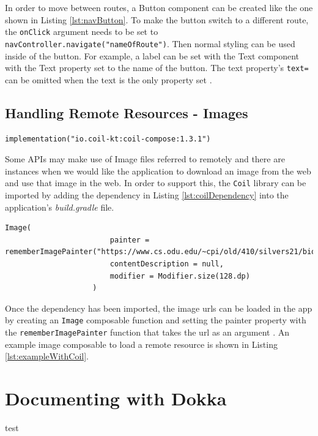 \documentclass[12pt]{article}
\begin{document}
In order to move between routes, a Button component can be created like the one shown in Listing \ref{lst:navButton}. To make the button switch to a different route, the \verb|onClick| argument needs to be set to \verb|navController.navigate("nameOfRoute")|. Then normal styling can be used inside of the button. For example, a label can be set with the Text component with the Text property set to the name of the button. The text property's \verb|text=| can be omitted when the text is the only property set \cite{mediumJetpackNavigation}.  

\subsection{Handling Remote Resources - Images}
\begin{lstlisting}[numbers=none, 
			caption=Coil Dependency,
			label={lst:coilDependency}]
implementation("io.coil-kt:coil-compose:1.3.1")
\end{lstlisting}
Some APIs may make use of Image files referred to remotely and there are instances when we would like the application to download an image from the web and use that image in the web. In order to support this, the \verb|Coil| library can be imported by adding the dependency in Listing \ref{lst:coilDependency} into the application's \textit{build.gradle} file. 

\begin{lstlisting}[numbers=none, 
			caption=Example Image using Coil,
			label={lst:exampleWithCoil}]
Image(
                        painter = rememberImagePainter("https://www.cs.odu.edu/~cpi/old/410/silvers21/bio/Jacob\_Conner.jpg"),
                        contentDescription = null,
                        modifier = Modifier.size(128.dp)
                    )
\end{lstlisting}


Once the dependency has been imported, the image urls can be loaded in the app by creating an \verb|Image| composable function and setting the painter property with the \verb|rememberImagePainter| function that takes the url as an argument \cite{StackOverflowCoil}. An example image composable to load a remote resource is shown in Listing \ref{lst:exampleWithCoil}.

                    

\section{Documenting with Dokka}
test
\begin{appendix}
  \listoffigures
  \newpage
  \listoftables
  \newpage
  \lstlistoflistings

\end{appendix}
\newpage
\RaggedRight
{}
  
\end{document}
